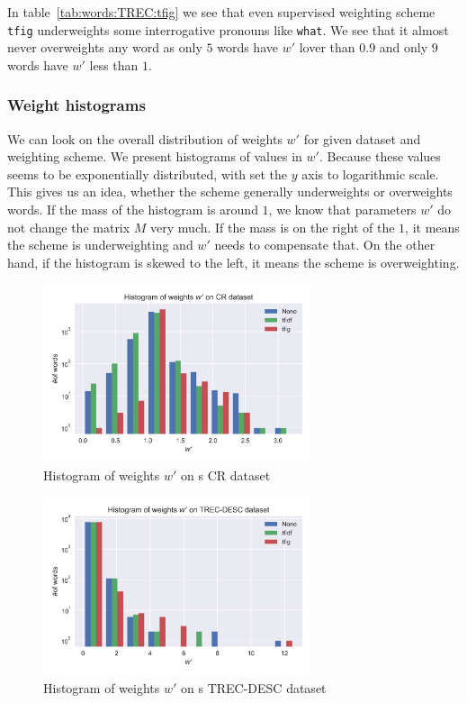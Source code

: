     In table~\ref{tab:words:TREC:tfig} we see that even supervised weighting scheme \texttt{tfig} underweights some interrogative pronouns like \texttt{what}.
    We see that it almost never overweights any word as only $5$ words have $w'$ lover than $0.9$ and only $9$ words have $w'$ less than $1$.

    \newpage
    \subsubsection{Weight histograms}
    
    We can look on the overall distribution of weights $w'$ for given dataset and weighting scheme.
    We present histograms of values in $w'$.
    Because these values seems to be exponentially distributed, with set the $y$ axis to logarithmic scale.
    This gives us an idea, whether the scheme generally underweights or overweights words.
    If the mass of the histogram is around $1$, we know that parameters $w'$ do not change the matrix $M$ very much.
    If the mass is on the right of the $1$, it means the scheme is underweighting and $w'$ needs to compensate that. On the other hand, if the histogram is skewed to the left, it means the scheme is overweighting.
    
    
    
    \begin{figure}
    \centerline{\includegraphics[width=0.7\textwidth]{images/histw_cr.png}}
    \caption[Histogram of weights $w'$ on s CR dataset]{Histogram of weights $w'$ on s CR dataset}
    \label{obr:hist:cr}
    \end{figure}

    \begin{figure}
    \centerline{\includegraphics[width=0.7\textwidth]{images/histw_desc.png}}
    \caption[Histogram of weights $w'$ on s TREC-DESC dataset]{Histogram of weights $w'$ on s TREC-DESC dataset}
    \label{obr:hist:desc}
    \end{figure}

